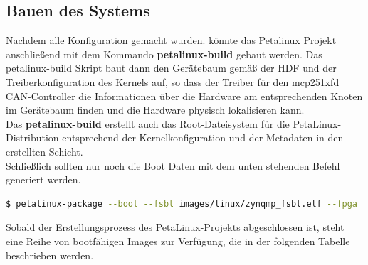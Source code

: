 \subsection{Bauen des Systems}
Nachdem alle Konfiguration gemacht wurden. könnte das Petalinux Projekt anschließend mit dem Kommando \textbf{petalinux-build} gebaut werden. Das petalinux-build Skript baut dann den Gerätebaum gemäß der HDF und der Treiberkonfiguration des Kernels auf, so dass der Treiber für den mcp251xfd CAN-Controller die Informationen über die Hardware am entsprechenden Knoten im Gerätebaum finden und die Hardware physisch lokalisieren kann.\\
Das \textbf{petalinux-build} erstellt auch das Root-Dateisystem für die PetaLinux-Distribution entsprechend der Kernelkonfiguration und der Metadaten in den erstellten Schicht.\\
Schließlich sollten nur noch die Boot Daten mit dem unten stehenden Befehl generiert werden.
\begin{lstlisting}[language=bash]
	$ petalinux-package --boot --fsbl images/linux/zynqmp_fsbl.elf --fpga ../bitstream/bd1_wrapper.bit --pmufw images/linux/pmufw.elf --u-boot --force
\end{lstlisting}

Sobald der Erstellungsprozess des PetaLinux-Projekts abgeschlossen ist, steht eine Reihe von bootfähigen Images zur Verfügung, die in der folgenden Tabelle beschrieben werden.\\


